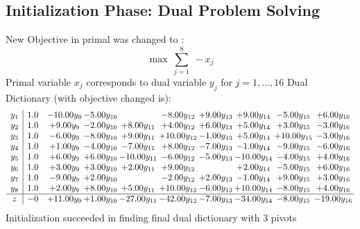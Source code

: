 \documentclass[9pt]{article}
\begin{document}
\subsection{Initialization Phase: Dual Problem Solving}
New Objective in primal was changed to : \[ \max\ \sum_{j=1}^{8}\ - x_j \] 
Primal variable $x_j$ corresponds to dual variable $y_j$ for $j = 1,\ldots,16$
Dual Dictionary (with objective changed is): 
\[\begin{array}{c| c c@{\hskip 2pt} c@{\hskip 2pt} c@{\hskip 2pt} c@{\hskip 2pt} c@{\hskip 2pt} c@{\hskip 2pt} c@{\hskip 2pt} c@{\hskip 2pt} }
 y_{1}   &  1.0 & -10.00 y_{9} & -5.00 y_{10} &   & -8.00 y_{12} & +  9.00 y_{13} & +  9.00 y_{14} & -5.00 y_{15} & +  6.00 y_{16}\\
 y_{2}   &  1.0 & +  9.00 y_{9} & -2.00 y_{10} & +  8.00 y_{11} & +  4.00 y_{12} & +  6.00 y_{13} & +  5.00 y_{14} & +  3.00 y_{15} & -3.00 y_{16}\\
 y_{3}   &  1.0 & -6.00 y_{9} & -8.00 y_{10} & +  9.00 y_{11} & + 10.00 y_{12} & -1.00 y_{13} & +  5.00 y_{14} & + 10.00 y_{15} & -3.00 y_{16}\\
 y_{4}   &  1.0 & +  1.00 y_{9} & -4.00 y_{10} & -7.00 y_{11} & +  8.00 y_{12} & -7.00 y_{13} & -1.00 y_{14} & -9.00 y_{15} & -6.00 y_{16}\\
 y_{5}   &  1.0 & +  6.00 y_{9} & +  6.00 y_{10} & -10.00 y_{11} & -6.00 y_{12} & -5.00 y_{13} & -10.00 y_{14} & -4.00 y_{15} & +  4.00 y_{16}\\
 y_{6}   &  1.0 & +  3.00 y_{9} & +  3.00 y_{10} & +  2.00 y_{11} & +  9.00 y_{12} &   & +  2.00 y_{14} & -5.00 y_{15} & +  6.00 y_{16}\\
 y_{7}   &  1.0 & -9.00 y_{9} & +  2.00 y_{10} &   & -2.00 y_{12} & +  2.00 y_{13} & -1.00 y_{14} & +  9.00 y_{15} & +  3.00 y_{16}\\
 y_{8}   &  1.0 & +  2.00 y_{9} & +  8.00 y_{10} & +  5.00 y_{11} & + 10.00 y_{12} & -6.00 y_{13} & + 10.00 y_{14} & -8.00 y_{15} & +  4.00 y_{16}\\
\hline
z    &  -0 & + 11.00 y_{9} & +  1.00 y_{10} & -27.00 y_{11} & -42.00 y_{12} & -7.00 y_{13} & -34.00 y_{14} & -8.00 y_{15} & -19.00 y_{16}\\
\end{array}\]
Initialization succeeded in finding final dual dictionary with 3 pivots
\end{document}
